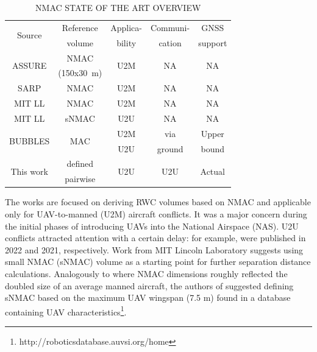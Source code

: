 \documentclass[10pt,conference]{IEEEtran}
\begin{document}
\begin{table}[h]
\centering
\vspace{2mm}
\caption{NMAC STATE OF THE ART OVERVIEW}
\label{Tab:sota}
\begin{tabular}{c||c|c|c|c}
\midrule
\multirow{ 2}{*}{Source}& Reference & Applica-& Communi-&GNSS \\ 
& volume& bility& cation&support\\ \midrule


\multirow{ 2}{*}{ASSURE \cite{Assure}}& NMAC&\multirow{ 2}{*}{U2M}&\multirow{ 2}{*}{NA}&\multirow{ 2}{*}{NA}\\
&(150x30~m)&&&\\
\midrule
SARP \cite{Weinert16,Cook15}& NMAC&U2M&NA&NA\\\midrule
MIT LL\cite{Weinert18}& NMAC &U2M&NA&NA\\ \midrule
MIT LL\cite{Weinert22}& sNMAC &U2U&NA&NA\\ \midrule
\multirow{ 2}{*}{BUBBLES \cite{Bubbles21}}& \multirow{ 2}{*}{MAC} &U2M&via&Upper\\
&&U2U&ground&bound\\ \midrule
\multirow{ 2}{*}{This work}& defined&\multirow{ 2}{*}{U2U}&\multirow{ 2}{*}{U2U}&\multirow{ 2}{*}{Actual}\\
& pairwise&&&\\
\midrule

\end{tabular}
\vspace{-5mm}
\end{table}


The works \cite{Assure,Weinert16,Cook15,Weinert18} are focused on deriving RWC volumes based on NMAC and applicable only for UAV-to-manned (U2M) aircraft conflicts. It was a major concern during the initial phases of introducing UAVs into the National Airspace (NAS).
U2U conflicts attracted attention with a certain delay: for example, \cite{Weinert22,Bubbles21} were published in 2022 and 2021, respectively. Work \cite{Weinert22} from MIT Lincoln Laboratory suggests using small NMAC (sNMAC) volume as a starting point for further separation distance calculations. Analogously to \cite{eurocontrol} where NMAC dimensions roughly reflected the doubled size of an average manned aircraft, the authors of \cite{Weinert22} suggested defining sNMAC  based on the maximum UAV wingspan (7.5 m) found in a database containing UAV characteristics\footnote{http://roboticsdatabase.auvsi.org/home}.
\end{document}
